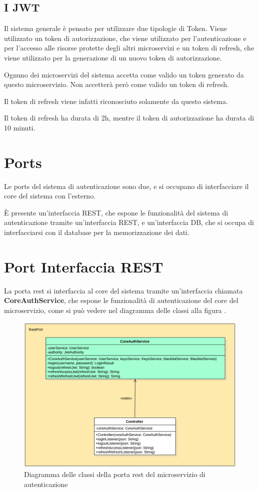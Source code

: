 \subsection{I JWT}

Il sistema generale è pensato per utilizzare due tipologie di Token. Viene utilizzato un token di autorizzazione, che viene utilizzato per l'autenticazione e per l'accesso alle risorse protette degli altri microservizi e un token di refresh, che viene utilizzato per la generazione di un nuovo token di autorizzazione.

Ognuno dei microservizi del sistema accetta come valido un token generato da questo microservizio. Non accetterà però come valido un token di refresh.

Il token di refresh viene infatti riconosciuto solamente da questo sistema.

Il token di refresh ha durata di 2h, mentre il token di autorizzazione ha durata di 10 minuti.


\section{Ports}

Le ports del sistema di autenticazione sono due, e si occupano di interfacciare il core del sistema con l'esterno.

È presente un'interfaccia REST, che espone le funzionalità del sistema di autenticazione tramite un'interfaccia REST, e un'interfaccia DB, che si occupa di interfacciarsi con il database per la memorizzazione dei dati.

\section{Port Interfaccia REST}

La porta rest si interfaccia al core del sistema tramite un'interfaccia chiamata \textbf{CoreAuthService}, che espone le funzionalità di autenticazione del core del microservizio, come si può vedere nel diagramma delle classi alla figura .
\begin{figure}[ht]
    \centering
    \includegraphics[width=\textwidth]{img/classi_portrest.png}
    \caption{Diagramma delle classi della porta rest del microservizio di autenticazione}
    \label{fig:classi_portrest}
\end{figure}

